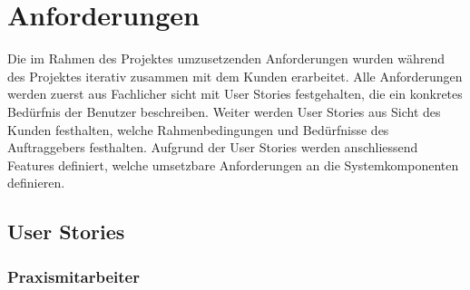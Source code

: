 \section{Anforderungen}\label{sec:anforderungen}

Die im Rahmen des Projektes umzusetzenden Anforderungen wurden während des Projektes iterativ zusammen mit dem Kunden erarbeitet.
Alle Anforderungen werden zuerst aus Fachlicher sicht mit User Stories festgehalten, die ein konkretes Bedürfnis der Benutzer beschreiben.
Weiter werden User Stories aus Sicht des Kunden festhalten, welche Rahmenbedingungen und Bedürfnisse des Auftraggebers festhalten.
Aufgrund der User Stories werden anschliessend Features definiert, welche umsetzbare Anforderungen an die Systemkomponenten definieren.

\subsection{User Stories}\label{subsec:user-stories}

\subsubsection*{Praxismitarbeiter}


